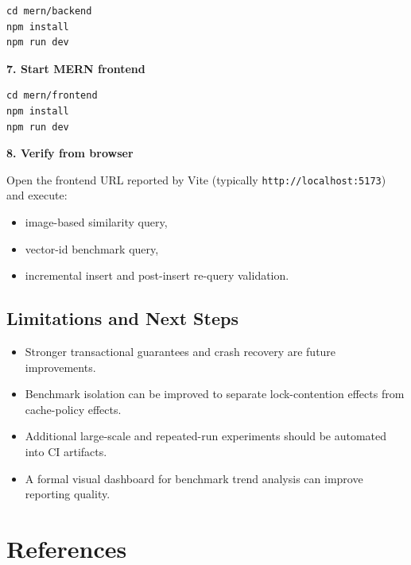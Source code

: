 \documentclass[11pt,a4paper]{article}
\begin{document}
\begin{lstlisting}[style=codeblock]
cd mern/backend
npm install
npm run dev
\end{lstlisting}

\textbf{7. Start MERN frontend}

\begin{lstlisting}[style=codeblock]
cd mern/frontend
npm install
npm run dev
\end{lstlisting}

\textbf{8. Verify from browser}

Open the frontend URL reported by Vite (typically \texttt{http://localhost:5173}) and execute:

\begin{itemize}[leftmargin=1.5em]
  \item image-based similarity query,
  \item vector-id benchmark query,
  \item incremental insert and post-insert re-query validation.
\end{itemize}

\subsection{Limitations and Next Steps}

\begin{itemize}[leftmargin=1.5em]
  \item Stronger transactional guarantees and crash recovery are future improvements.
  \item Benchmark isolation can be improved to separate lock-contention effects from cache-policy effects.
  \item Additional large-scale and repeated-run experiments should be automated into CI artifacts.
  \item A formal visual dashboard for benchmark trend analysis can improve reporting quality.
\end{itemize}

\section{References}
\end{document}
